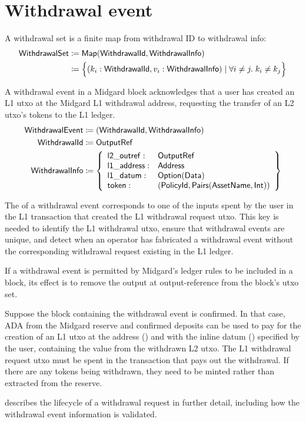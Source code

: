 \documentclass[../midgard.tex]{subfiles}
\begin{document}
\section{Withdrawal event}
\label{h:withdrawal-event}

A withdrawal set is a finite map from withdrawal ID to withdrawal info:
\begin{align*}
    \mathsf{WithdrawalSet} &\coloneq \mathsf{Map(WithdrawalId, WithdrawalInfo)} \\
      &\coloneq \Bigl\{
        (k_i: \mathsf{WithdrawalId}, v_i: \mathsf{WithdrawalInfo}) \mid \forall i \neq j.\; k_i \neq k_j
    \Bigr\}
\end{align*}

A withdrawal event in a Midgard block acknowledges that a user has created an L1 utxo at the Midgard L1 withdrawal address, requesting the transfer of an L2 utxo's tokens to the L1 ledger.
\begin{align*}
    \mathsf{WithdrawalEvent} &\coloneq \mathsf{(WithdrawalId, WithdrawalInfo)} \\
    \mathsf{WithdrawalId} &\coloneq \mathsf{OutputRef} \\
    \mathsf{WithdrawalInfo} &\coloneq \left\{
        \begin{array}{ll}
            \mathsf{l2\_outref} :& \mathsf{OutputRef} \\
            \mathsf{l1\_address} : & \mathsf{Address} \\
            \mathsf{l1\_datum} : & \mathsf{Option(Data)} \\
            \mathsf{token} : & \mathsf{(PolicyId, Pairs(AssetName, Int))}
        \end{array} \right\}
\end{align*}

The  of a withdrawal event corresponds to one of the inputs spent by the user in the L1 transaction that created the L1 withdrawal request utxo.
This key is needed to identify the L1 withdrawal utxo, ensure that withdrawal events are unique, and detect when an operator has fabricated a withdrawal event without the corresponding withdrawal request existing in the L1 ledger.

If a withdrawal event is permitted by Midgard's ledger rules to be included in a block, its effect is to remove the output at output-reference  from the block's utxo set.

Suppose the block containing the withdrawal event is confirmed.
In that case, ADA from the Midgard reserve and confirmed deposits can be used to pay for the creation of an L1 utxo at the address () and with the inline datum () specified by the user, containing the value from the withdrawn L2 utxo.
The L1 withdrawal request utxo must be spent in the transaction that pays out the withdrawal. If there are any tokens being withdrawn, they need to be minted rather than extracted from the reserve.

 describes the lifecycle of a withdrawal request in further detail, including how the withdrawal event information is validated.
\end{document}
